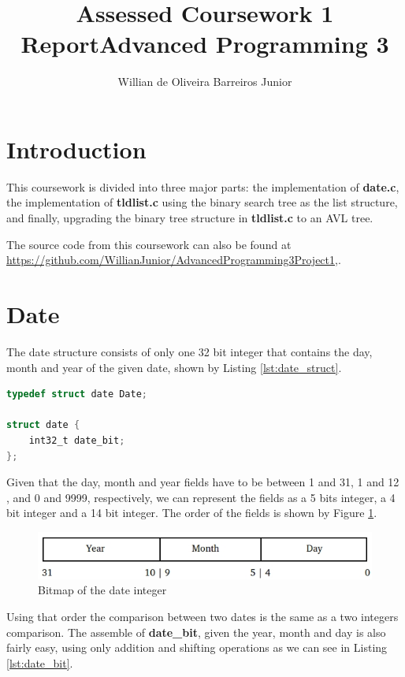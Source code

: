 \documentclass[twocolumn,10pt]{article}
\title{Assessed Coursework 1 Report\linebreak Advanced Programming 3 }
\author{Willian de Oliveira Barreiros Junior}
\begin{document}
\maketitle

\section{Introduction}

This coursework is divided into three major parts: the implementation of \textbf{date.c}, the implementation of \textbf{tldlist.c} using the binary search tree as the list structure, and finally, upgrading the binary tree structure in \textbf{tldlist.c} to an AVL tree. 

The source code from this coursework can also be found at
\url{https://github.com/WillianJunior/AdvancedProgramming3Project1},.

\section{Date}

The date structure consists of only one 32 bit integer that contains the day, month and year of the given date, shown by Listing \ref{lst:date_struct}.

\begin{lstlisting}[language=C, caption={Date struct}, label=lst:date_struct]
typedef struct date Date;

struct date {
	int32_t date_bit;
};
\end{lstlisting}

Given that the day, month and year fields have to be between 1 and 31, 1 and 12 , and 0 and 9999, respectively, we can represent the fields as a 5 bits integer, a 4 bit integer and a 14 bit integer. The order of the fields is shown by Figure \ref{fig:date_bit}.

\begin{figure}[h]
\centering
\includegraphics[scale=0.35]{img1.jpg}
\caption{Bitmap of the date integer}
\label{fig:date_bit}
\end{figure}

Using that order the comparison between two dates is the same as a two integers comparison. The assemble of \textbf{date\_{}bit}, given the year, month and day is also fairly easy, using only addition and shifting operations as we can see in Listing \ref{lst:date_bit}.
\end{document}
